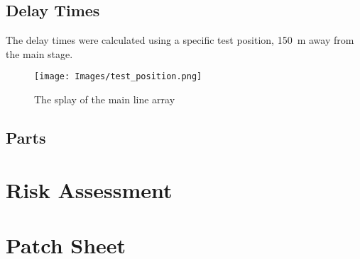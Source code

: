\documentclass{BCUReport}
\begin{document}
\begin{appendices}
            \label{appendix:speaker_rigging}
            
        
        \subsection{Delay Times}
        The delay times were calculated using a specific test position, \SI{150}{\metre} away from the main stage.
        \begin{figure}[H]
            \centering
            \texttt{[image: Images/test\_position.png]}
            \caption{The splay of the main line array}
            \label{fig:speaker_test_pos}
        \end{figure}
        
            \label{appendix:speaker_delays}
            
            
        \subsection{Parts}
            \label{appendix:speaker_parts}
            
            
    \section{Risk Assessment}
        \label{appendix:risk_assessment}
        

    \section{Patch Sheet}
        \label{appendix:patch_sheet}
        

\end{appendices}
\end{document}
